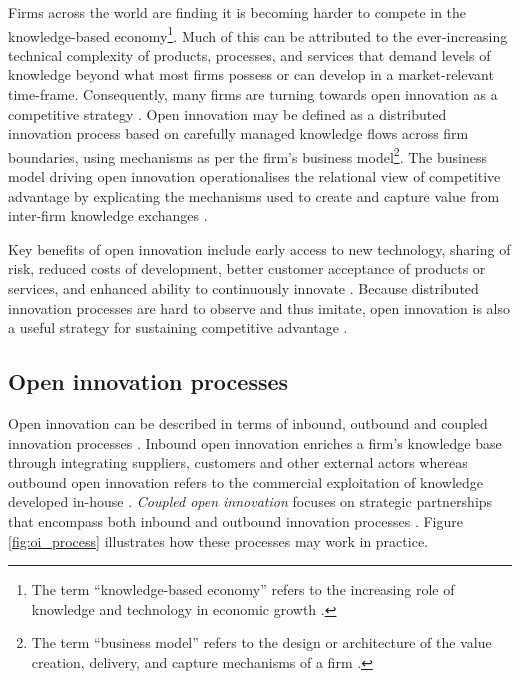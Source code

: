 Firms across the world are finding it is becoming harder to compete in the knowledge-based economy\footnote{The term \enquote{knowledge-based economy} refers to the increasing role of knowledge and technology in economic growth \citep{oecd1996knowledge}.}. Much of this can be attributed to the ever-increasing technical complexity of products, processes, and services that demand levels of knowledge beyond what most firms possess or can develop in a market-relevant time-frame. Consequently, many firms are turning towards open innovation as a competitive strategy \citep{enkel2009open,bessant2013innovation,stanko2017under}. Open innovation may be defined as a distributed innovation process based on carefully managed knowledge flows across firm boundaries, using mechanisms as per the firm's business model\footnote{The term \enquote{business model} refers to the design or architecture of the value creation, delivery, and capture mechanisms of a firm \citep{teece2010business}.}. The business model driving open innovation operationalises the relational view of competitive advantage by explicating the mechanisms used to create and capture value from inter-firm knowledge exchanges \citep{durst2013success,chesbrough2017future}. \medskip

Key benefits of open innovation include early access to new technology, sharing of risk, reduced costs of development, better customer acceptance of products or services, and enhanced ability to continuously innovate \citep{ye2013exploring}. Because distributed innovation processes are hard to observe and thus imitate, open innovation is also a useful strategy for sustaining competitive advantage \citep{barney1991firm,lichtenthaler2011open}. \medskip

\subsection{Open innovation processes}

Open innovation can be described in terms of inbound, outbound and coupled innovation processes \citep{gassmann2004towards}. Inbound open innovation enriches a firm’s knowledge base through integrating suppliers, customers and other external actors \citep{xu2013inbound} whereas outbound open innovation refers to the commercial exploitation of knowledge developed in-house \citep{de2016knowledge}. \emph{Coupled open innovation} focuses on strategic partnerships that encompass both inbound and outbound innovation processes \citep{spithoven2013open}. Figure \ref{fig:oi_process} illustrates how these processes may work in practice. \medskip

